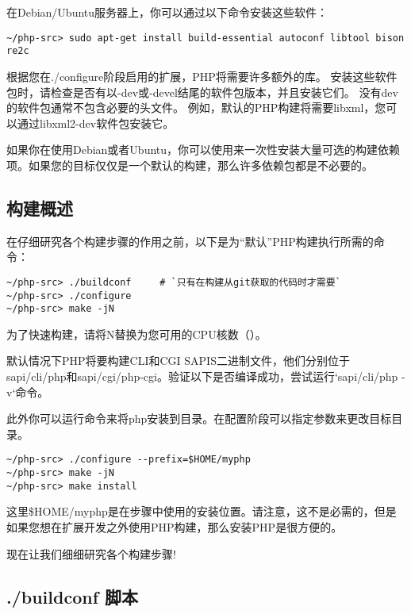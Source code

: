 在Debian/Ubuntu服务器上，你可以通过以下命令安装这些软件：

\begin{lstlisting}[language=shell]
~/php-src> sudo apt-get install build-essential autoconf libtool bison re2c
\end{lstlisting}

根据您在./configure阶段启用的扩展，PHP将需要许多额外的库。 安装这些软件包时，请检查是否有以-dev或-devel结尾的软件包版本，并且安装它们。 没有dev的软件包通常不包含必要的头文件。 例如，默认的PHP构建将需要libxml，您可以通过libxml2-dev软件包安装它。


如果你在使用Debian或者Ubuntu，你可以使用来一次性安装大量可选的构建依赖项。如果您的目标仅仅是一个默认的构建，那么许多依赖包都是不必要的。

\subsection{构建概述}

在仔细研究各个构建步骤的作用之前，以下是为“默认”PHP构建执行所需的命令：

\begin{lstlisting}[language=shell]
~/php-src> ./buildconf     # `只有在构建从git获取的代码时才需要`
~/php-src> ./configure
~/php-src> make -jN
\end{lstlisting}

为了快速构建，请将N替换为您可用的CPU核数（）。

默认情况下PHP将要构建CLI和CGI SAPIS二进制文件，他们分别位于sapi/cli/php和sapi/cgi/php-cgi。验证以下是否编译成功，尝试运行`sapi/cli/php -v`命令。


此外你可以运行命令来将php安装到目录。在配置阶段可以指定参数来更改目标目录。

\begin{lstlisting}[language=shell]
~/php-src> ./configure --prefix=$HOME/myphp
~/php-src> make -jN
~/php-src> make install
\end{lstlisting}

这里\$HOME/myphp是在步骤中使用的安装位置。请注意，这不是必需的，但是如果您想在扩展开发之外使用PHP构建，那么安装PHP是很方便的。

现在让我们细细研究各个构建步骤!


\subsection{./buildconf 脚本}

